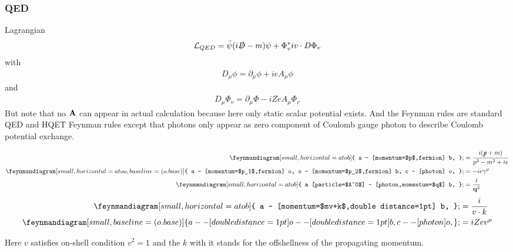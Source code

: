 \documentclass{article}
\newcommand{\gm}{\gamma^{\mu}}
\newcommand{\lag}{\mathcal{L}}
\begin{document}
\subsubsection{QED}
Lagrangian
\begin{align}
	\lag_{QED}=\bar\psi(i\slashed D-m)\psi+\Phi_v^*iv\cdot D\Phi_v
	\label{SQEDLAG}
\end{align}
with
\begin{align*}
	D_{\mu}\phi=\partial_{\mu}\phi+ieA_{\mu}\phi
\end{align*}
and
\begin{align*}
	D_{\mu}\Phi_v=\partial_{\mu}\Phi-iZeA_{\mu}\Phi_v
\end{align*}
But note that no $\vb{A}$ can appear in actual calculation because here only static scalar potential exists.
And the Feynman rules are standard QED and HQET Feynman rules except that photons only appear as zero component of Coulomb gauge photon to describe Coulomb potential exchange.

\begin{minipage}{\linewidth}
	\begin{multicols}{2}
		\begin{align*}
			\feynmandiagram[small,horizontal=a to b]{
			a -- [momentum=$p$,fermion] b,
			}; & =\frac{i(\slashed p +m)}{p^2-m^2+i\epsilon} \\
			\feynmandiagram[small,horizontal=a to o,baseline=(o.base)]{
			a -- [momentum=$p_1$,fermion] o,
			o -- [momentum=$p_2$,fermion] b,
			c -- [photon] o,
			}; & =-ie\gm                                     \\
			\feynmandiagram[small,horizontal=a to b]{
			a [particle=$A^0$] -- [photon,momentum=$q$] b,
			}; & =\frac{i}{\vb{q}^2}                         \\
		\end{align*}
		\begin{align*}
			\feynmandiagram[small,horizontal=a to b]{
			a -- [momentum=$mv+k$,double distance=1pt] b,
			}; & =\frac{i}{v\cdot k} \\
			\feynmandiagram[small,baseline=(o.base)]{
			a -- [double distance=1pt] o -- [double distance=1pt] b,
			c -- [photon] o,
			}; & =iZev^{\mu}         \\
		\end{align*}
	\end{multicols}
\end{minipage}


Here $v$ satisfies on-shell condition $v^2=1$ and the $k$ with it stands for the offshellness of the propagating momentum.
\end{document}

